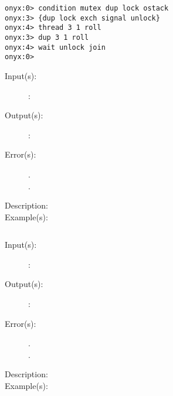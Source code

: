 \begin{description}
\begin{description}
\begin{verbatim}
onyx:0> condition mutex dup lock ostack
onyx:3> {dup lock exch signal unlock}
onyx:4> thread 3 1 roll
onyx:3> dup 3 1 roll
onyx:4> wait unlock join
onyx:0>
		\end{verbatim}
	\end{description}
\label{systemdict:sigpending}
\item[{\onyxop{OPARGS}{sigpending}{OPOUTS}}: ]
	\begin{description}\item[]
	\item[Input(s): ]
		\begin{description}\item[]
		\item[: ]
		\end{description}
	\item[Output(s): ]
		\begin{description}\item[]
		\item[: ]
		\end{description}
	\item[Error(s): ]
		\begin{description}\item[]
		\item[.]
		\item[.]
		\end{description}
	\item[Description: ]
	\item[Example(s): ]\begin{verbatim}

		\end{verbatim}
	\end{description}
\label{systemdict:sigsuspend}
\item[{\onyxop{OPARGS}{sigsuspend}{OPOUTS}}: ]
	\begin{description}\item[]
	\item[Input(s): ]
		\begin{description}\item[]
		\item[: ]
		\end{description}
	\item[Output(s): ]
		\begin{description}\item[]
		\item[: ]
		\end{description}
	\item[Error(s): ]
		\begin{description}\item[]
		\item[.]
		\item[.]
		\end{description}
	\item[Description: ]
	\item[Example(s): ]\begin{verbatim}


\end{verbatim}
\end{description}
\end{description}
